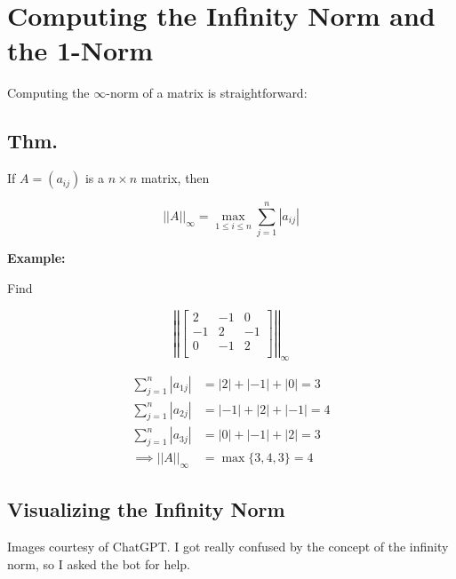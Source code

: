 \documentclass[12pt]{article}
\begin{document}
\section{Computing the Infinity Norm and the 1-Norm}

Computing the $\infty$-norm of a matrix is straightforward:

\subsection{Thm.}

If $A=(a_{ij})$ is a $n \times n$ matrix, then

\begin{equation*}
  ||A||_\infty = \max_{1\leq i \leq n} \sum_{j=1}^n |a_{ij}|
\end{equation*}

\textbf{Example:}

Find 

\begin{equation*}
  \left|\left| \begin{bmatrix}
  2 & -1 & 0\\
  -1 & 2 & -1\\
  0 & -1 & 2\\
  \end{bmatrix} \right|\right|_\infty
\end{equation*}

\begin{align*}
  \sum_{j=1}^n |a_{1j}| &= |2| + |-1| + |0| = 3 \\
  \sum_{j=1}^n |a_{2j}| &= |-1| + |2| + |-1| = 4 \\
  \sum_{j=1}^n |a_{3j}| &= |0| + |-1| + |2| = 3 \\
  \implies ||A||_\infty &= \max\{3, 4, 3\} = 4
\end{align*}

\pagebreak
\subsection{Visualizing the Infinity Norm}

Images courtesy of ChatGPT. I got really confused by the concept of the
infinity norm, so I asked the bot for help.
\end{document}
